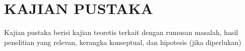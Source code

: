 \chapter{KAJIAN PUSTAKA}
Kajian pustaka berisi kajian teoretis terkait dengan rumusan masalah, hasil penelitian yang relevan, kerangka konseptual, dan hipotesis (jika diperlukan)